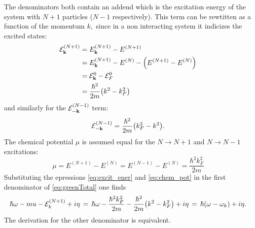 \documentclass[a4paper]{article}
\begin{document}
The denominators both contain an addend which is the excitation energy of the system with $N+1$ particles ($N-1$ respectively).
This term can be rewtitten as a function of the momentum $k,$ since in a non interacting system it indicizes the excited states:
\begin{align}
\mathcal{E}_{\vb{k}}^{(N+1)} &= E_{\vb{k}}^{(N+1)} - E^{(N+1)}\\
&= E^{(N+1)}_{\vb{k}} - E^{(N)} - \pqty{E^{(N+1)} - E^{(N)}}\\
&= \mathcal{E}_{\vb{k}}^0 - \mathcal{E}_{F}^0\\
&= \frac{\hbar^2}{2m} \pqty{k^2 - k_F^2} \label{eq:excit_ener}
\end{align}
and similarly for the $\mathcal{E}_{-\vb{k}}^{(N-1)}$ term:
\begin{equation}
\mathcal{E}_{-\vb{k}}^{(N-1)} =  \frac{\hbar^2}{2m} \pqty{k_F^2 - k^2}.
\end{equation}
The chemical potential $\mu$ is assumed equal for the $N \rightarrow N+1$ and $N \rightarrow N-1$ excitations:
\begin{equation}
\mu = E^{(N+1)} - E^{(N)}=E^{(N-1)} - E^{(N)} =\frac{\hbar^2k_F^2}{2m} \label{eq:chem_pot}
\end{equation}
Substituting the epressions \eqref{eq:excit_ener} and \eqref{eq:chem_pot} in the first denominator of \eqref{eq:greenTotal} one finds
\begin{equation}
\hbar\omega - mu -\mathcal{E}_k^{(N+1)} +i \eta \,= \,\hbar\omega -\frac{\hbar^2k^2_F}{2m} - \frac{\hbar^2}{2m}\pqty{k^2 - k_F^2} + i\eta \,=\, \hbar\pqty{\omega - \omega_k} + i\eta.
\end{equation}
The derivation for the other denominator is equivalent.
\end{document}
